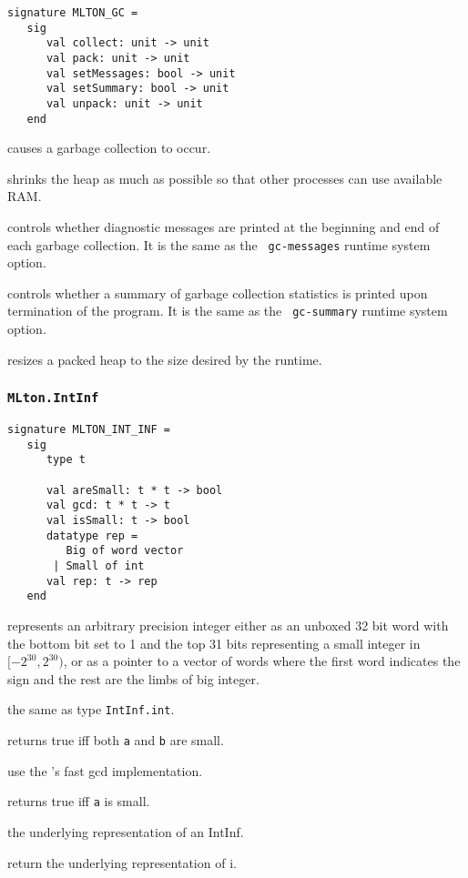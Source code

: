 \begin{verbatim}
signature MLTON_GC =
   sig
      val collect: unit -> unit
      val pack: unit -> unit
      val setMessages: bool -> unit
      val setSummary: bool -> unit
      val unpack: unit -> unit
   end
\end{verbatim}

\begin{description}
causes a garbage collection to occur.

shrinks the heap as much as possible so that other processes can use
available RAM.

controls whether diagnostic messages are printed at the beginning and
end of each garbage collection.  It is the same as the {\tt
gc-messages} runtime system option.

controls whether a summary of garbage collection statistics is printed
upon termination of the program.  It is the same as the {\tt
gc-summary} runtime system option.

resizes a packed heap to the size desired by the runtime.

\end{description}
%
\subsubsection{{\tt MLton.IntInf}}

\begin{verbatim}
signature MLTON_INT_INF =
   sig
      type t

      val areSmall: t * t -> bool
      val gcd: t * t -> t
      val isSmall: t -> bool
      datatype rep =
         Big of word vector
       | Small of int
      val rep: t -> rep
   end
\end{verbatim}

{\mlton} represents an arbitrary precision integer either as an
unboxed 32 bit word with the bottom bit set to 1 and the top 31 bits
representing a small integer in $[-2^{30}, 2^{30})$, or as a pointer
to a vector of words where the first word indicates the sign and the
rest are the limbs of {\gmp} big integer.

\begin{description}

the same as type {\tt IntInf.int}.

returns true iff both {\tt a} and {\tt b} are small.

use the {\gmp}'s fast gcd implementation.

returns true iff {\tt a} is small.

the underlying representation of an IntInf.

return the underlying representation of i.

\end{description}

